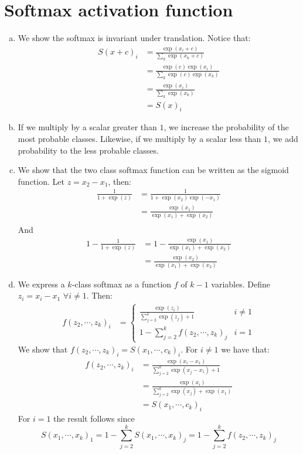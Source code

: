 \documentclass[paper=a4, fontsize=11pt]{scrartcl} %
\numberwithin{equation}{section} %
\numberwithin{figure}{section} %
\numberwithin{table}{section} %
\begin{document}
\section{Softmax activation function}
\begin{enumerate}[(a)]
	\item We show the softmax is invariant under translation. Notice that:
	\begin{align*}
	S(x+c)_i &= \frac{\exp(x_i + c)}{\sum_k \exp(x_k + c)}\\
	&= \frac{\exp(c)\exp(x_i)}{\sum_k \exp(c)\exp(x_k)}\\
	&= \frac{\exp(x_i)}{\sum_k \exp(x_k)}\\
	&= S(x)_i
	\end{align*}
	\item If we multiply by a scalar greater than $1$, we increase the probability of the most probable classes. Likewise, if we multiply by a scalar less than $1$, we add probability to the less probable classes.
	
	\item We show that the two class softmax function can be written as the sigmoid function. Let $z = x_2 - x_1$, then:
	\begin{align*}
	\frac{1}{1+\exp(z)} &= \frac{1}{1 + \exp(x_2)\exp(-x_1)}\\
	&= \frac{\exp(x_1)}{\exp(x_1)+\exp(x_2)}\\
	\end{align*}
	And
	\begin{align*}
	1 - \frac{1}{1+\exp(z)} &= 1 - \frac{\exp(x_1)}{\exp(x_1)+\exp(x_2)}\\
	&= \frac{\exp(x_2)}{\exp(x_1)+\exp(x_2)}
	\end{align*}
	\item We express a $k$-class softmax as a function $f$ of $k-1$ variables. Define $z_i = x_i - x_1$ $\forall i \ne 1$. Then:
	\begin{align*}
	f(z_2, \cdots, z_{k})_i &= \begin{cases}
	\frac{\exp(z_i)}{\sum_{j=2}^{k} \exp(z_j) + 1} & i\ne 1\\
	1 - \sum_{j=2}^k f(z_{2},\cdots,z_{k})_j & i = 1
	\end{cases}
	\end{align*}
	We show that $f(z_2, \cdots, z_{k})_i = S(x_1, \cdots, c_k)_i$. For $i\ne 1$ we have that:
	\begin{align*}
	f(z_2, \cdots, z_{k})_i &= \frac{\exp(x_i-x_1)}{\sum_{j=2}^{k} \exp(x_j-x_1) + 1}\\
	&= \frac{\exp(x_i)}{\sum_{j=2}^{k} \exp(x_j) + \exp(x_1)}\\
	&= S(x_1, \cdots, c_k)_i
	\end{align*}
	For $i = 1$ the result follows since 
	$$S(x_1, \cdots, x_k)_1 = 1 - \sum_{j=2}^{k} S(x_1, \cdots, x_k)_j = 1 - \sum_{j=2}^k f(z_{2},\cdots,z_{k})_j$$

\end{enumerate}
\end{document}
